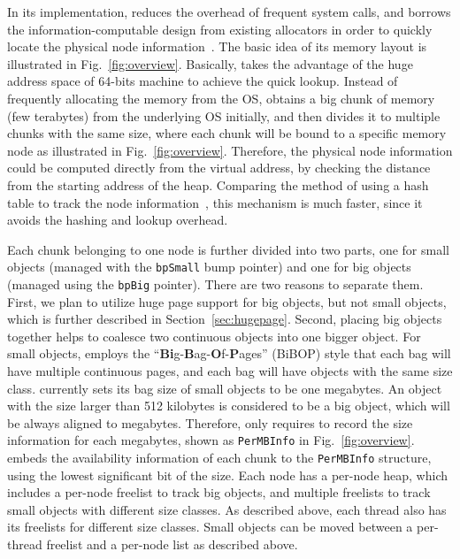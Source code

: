 In its implementation, \NA{} reduces the overhead of frequent system calls, and borrows the information-computable design from existing allocators in order to quickly locate the physical node information~\cite{FreeGuard, Guarder}. The basic idea of its memory layout is illustrated in Fig.~\ref{fig:overview}. Basically, \NA{} takes the advantage of the huge address space of 64-bits machine to achieve the quick lookup. Instead of frequently allocating the memory from the OS, \NA{} obtains a big chunk of memory (few terabytes) from the underlying OS initially, and then divides it to multiple chunks with the same size, where each chunk will be bound to a specific memory node as illustrated in Fig.~\ref{fig:overview}. Therefore, the physical node information could be computed directly from the virtual address, by checking the distance from the starting address of the heap. Comparing the method of using a hash table to track the node information~\cite{tcmallocnew}, this mechanism is much faster, since it avoids the hashing and lookup overhead.  

Each chunk belonging to one node is further divided into two parts, one for small objects (managed with the \texttt{bpSmall} bump pointer) and one for big objects (managed using the \texttt{bpBig} pointer). There are two reasons to separate them. First, we plan to utilize huge page support for big objects, but not small objects, which is further described in Section~\ref{sec:hugepage}.  Second, placing big objects together helps to coalesce two continuous objects into one bigger object. For small objects, \NM{} employs the ``\textbf{Bi}g-\textbf{B}ag-\textbf{O}f-\textbf{P}ages'' (BiBOP) style that each bag will have multiple continuous pages, and each bag will have objects with the same size class. \NM{} currently sets its bag size of small objects to be one megabytes. An object with the size larger than 512 kilobytes is considered to be a big object, which will be always aligned to megabytes. Therefore, \NM{} only requires to record the size information for each megabytes, shown as \texttt{PerMBInfo} in Fig.~\ref{fig:overview}. \NM{} embeds the availability information of each chunk to the \texttt{PerMBInfo} structure, using the lowest significant bit of the size. Each node has  a per-node heap, which includes a per-node freelist to track big objects, and multiple freelists to track small objects with different size classes. As described above, each thread also has its freelists for different size classes. Small objects can be moved between a per-thread freelist and a per-node list as described above. 
 

